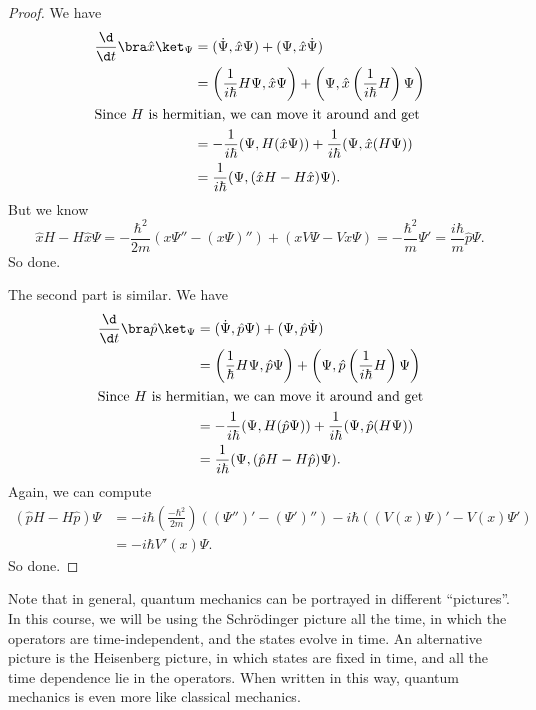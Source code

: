 \documentclass[a4paper]{article}
\begin{document}
\begin{proof}
  We have
  \begin{align*}
    \frac{\d}{\d t}\bra \hat{x}\ket_\Psi &= (\dot{\Psi}, \hat{x}\Psi) + (\Psi, \hat{x}\dot{\Psi})\\
    &= \left(\frac{1}{i\hbar}H\Psi, \hat{x}\Psi\right) + \left(\Psi, \hat{x}\left(\frac{1}{i\hbar}H\right)\Psi\right)\\
    \intertext{Since $H$ is hermitian, we can move it around and get}
    &= -\frac{1}{i\hbar}(\Psi, H(\hat{x}\Psi)) + \frac{1}{i\hbar}(\Psi, \hat{x}(H\Psi))\\
    &= \frac{1}{i\hbar}(\Psi, (\hat{x} H - H\hat{x}) \Psi).
  \end{align*}
  But we know
  \[
    \hat{x}H - H\hat{x}\Psi = -\frac{\hbar^2}{2m}(x\Psi'' - (x\Psi)'') + (xV\Psi - Vx\Psi) = -\frac{\hbar^2}{m}\Psi' = \frac{i\hbar}{m}\hat{p}\Psi.
  \]
  So done.

  The second part is similar. We have
  \begin{align*}
    \frac{\d}{\d t}\bra \hat{p}\ket_\Psi &= (\dot{\Psi}, \hat{p}\Psi) + (\Psi, \hat{p}\dot{\Psi})\\
    &= \left(\frac{1}{\hbar}H\Psi, \hat{p}\Psi\right) + \left(\Psi, \hat{p}\left(\frac{1}{i\hbar}H\right)\Psi\right)\\
    \intertext{Since $H$ is hermitian, we can move it around and get}
    &= -\frac{1}{i\hbar}(\Psi, H(\hat{p}\Psi)) + \frac{1}{i\hbar}(\Psi, \hat{p}(H\Psi))\\
    &= \frac{1}{i\hbar}(\Psi, (\hat{p} H - H\hat{p}) \Psi).
  \end{align*}
  Again, we can compute
  \begin{align*}
    (\hat{p}H - H\hat{p})\Psi &= -i\hbar \left(\frac{-\hbar^2}{2m}\right)((\Psi'')' - (\Psi')'') - i\hbar ((V(x)\Psi)' - V(x) \Psi') \\
    &= -i\hbar V'(x) \Psi.
  \end{align*}
  So done.
\end{proof}

Note that in general, quantum mechanics can be portrayed in different ``pictures''. In this course, we will be using the Schr\"odinger picture all the time, in which the operators are time-independent, and the states evolve in time. An alternative picture is the Heisenberg picture, in which states are fixed in time, and all the time dependence lie in the operators. When written in this way, quantum mechanics is even more like classical mechanics.
\end{document}
